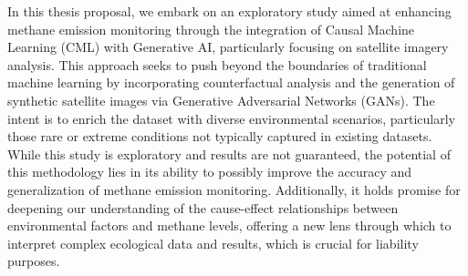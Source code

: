 \acresetall

In this thesis proposal, we embark on an exploratory study aimed at enhancing methane emission monitoring through the integration of Causal Machine Learning (CML) with Generative AI, particularly focusing on satellite imagery analysis. This approach seeks to push beyond the boundaries of traditional machine learning by incorporating counterfactual analysis and the generation of synthetic satellite images via Generative Adversarial Networks (GANs). The intent is to enrich the dataset with diverse environmental scenarios, particularly those rare or extreme conditions not typically captured in existing datasets. While this study is exploratory and results are not guaranteed, the potential of this methodology lies in its ability to possibly improve the accuracy and generalization of methane emission monitoring. Additionally, it holds promise for deepening our understanding of the cause-effect relationships between environmental factors and methane levels, offering a new lens through which to interpret complex ecological data and results, which is crucial for liability purposes.